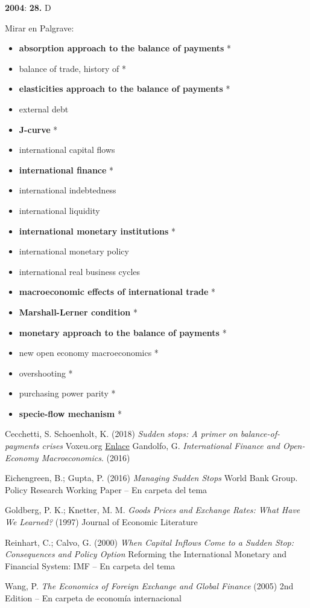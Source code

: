 \documentclass{nuevotema}
\begin{document}
\textbf{2004}: \textbf{28.} D

\bibliografia

Mirar en Palgrave:
\begin{itemize}
	\item \textbf{absorption approach to the balance of payments} *
	\item balance of trade, history of *
	\item \textbf{elasticities approach to the balance of payments} *
	\item external debt
	\item \textbf{J-curve} *
	\item international capital flows
	\item \textbf{international finance} *
	\item international indebtedness
	\item international liquidity
	\item \textbf{international monetary institutions} *
	\item international monetary policy
	\item international real business cycles
	\item \textbf{macroeconomic effects of international trade} *
	\item \textbf{Marshall-Lerner condition} *
	\item \textbf{monetary approach to the balance of payments} *
	\item new open economy macroeconomics *
	\item overshooting *
	\item purchasing power parity *
	\item \textbf{specie-flow mechanism} *
\end{itemize}

Cecchetti, S. Schoenholt, K. (2018) \textit{Sudden stops: A primer on balance-of-payments crises} Voxeu.org \href{https://voxeu.org/content/sudden-stops-primer-balance-payments-crises}{Enlace}
Gandolfo, G. \textit{International Finance and Open-Economy Macroeconomics}. (2016)

Eichengreen, B.; Gupta, P. (2016) \textit{Managing Sudden Stops} World Bank Group. Policy Research Working Paper -- En carpeta del tema

Goldberg, P. K.; Knetter, M. M. \textit{Goods Prices and Exchange Rates: What Have We Learned?} (1997) Journal of Economic Literature

Reinhart, C.; Calvo, G. (2000) \textit{When Capital Inflows Come to a Sudden Stop: Consequences and Policy Option} Reforming the International Monetary and Financial System: IMF -- En carpeta del tema 

Wang, P. \textit{The Economics of Foreign Exchange and Global Finance} (2005) 2nd Edition -- En carpeta de economía internacional
\end{document}
